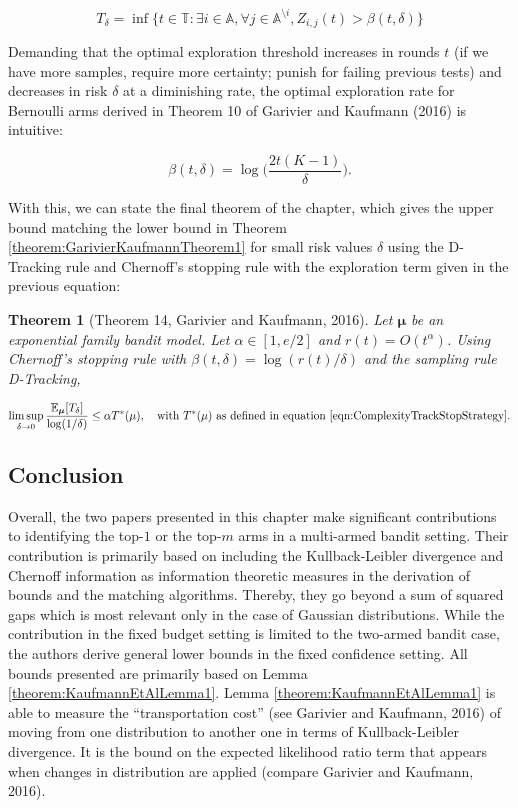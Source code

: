 \documentclass[11pt,]{article}
\newtheorem{theorem}{Theorem}
\begin{document}
\begin{equation*}
T_{\delta} = \inf \{t \in \mathbb{T}: \exists i \in \mathbb{A}, \forall j\in \mathbb{A}^{\setminus i}, Z_{i,j}(t) > \beta(t, \delta)\}
\end{equation*}

Demanding that the optimal exploration threshold increases in rounds
\(t\) (if we have more samples, require more certainty; punish for
failing previous tests) and decreases in risk \(\delta\) at a
diminishing rate, the optimal exploration rate for Bernoulli arms
derived in Theorem 10 of Garivier and Kaufmann (2016) is intuitive:

\begin{equation*}
\beta(t, \delta) = \log \Big(\frac{2t(K-1)}{\delta}\Big).
\end{equation*}

With this, we can state the final theorem of the chapter, which gives
the upper bound matching the lower bound in Theorem
\ref{theorem:GarivierKaufmannTheorem1} for small risk values \(\delta\)
using the D-Tracking rule and Chernoff's stopping rule with the
exploration term given in the previous equation:

\begin{theorem}[Theorem 14, Garivier and Kaufmann, 2016] \label{theorem:GarivierAndKaufmannTheorem14}
Let $\bm{\mu}$ be an exponential family bandit model. Let $\alpha \in [1, e/2]$ and $r(t) = O(t^{\alpha})$. Using Chernoff's stopping rule with $\beta(t,\delta) = \log(r(t)/\delta)$ and the sampling rule D-Tracking,

\begin{equation*}
\limsup_{\delta \to 0} \frac{\mathbb{E}_{\bm{\mu}}[T_{\delta}]}{\log(1/\delta)} \leq \alpha T^*(\mu), \quad \text{with } T^*(\mu) \text{ as defined in equation \ref{eqn:ComplexityTrackStopStrategy}}.
\end{equation*}
\end{theorem}

\subsection{Conclusion}\label{conclusion}

Overall, the two papers presented in this chapter make significant
contributions to identifying the top-\(1\) or the top-\(m\) arms in a
multi-armed bandit setting. Their contribution is primarily based on
including the Kullback-Leibler divergence and Chernoff information as
information theoretic measures in the derivation of bounds and the
matching algorithms. Thereby, they go beyond a sum of squared gaps which
is most relevant only in the case of Gaussian distributions. While the
contribution in the fixed budget setting is limited to the two-armed
bandit case, the authors derive general lower bounds in the fixed
confidence setting. All bounds presented are primarily based on Lemma
\ref{theorem:KaufmannEtAlLemma1}. Lemma \ref{theorem:KaufmannEtAlLemma1}
is able to measure the ``transportation cost'' (see Garivier and
Kaufmann, 2016) of moving from one distribution to another one in terms
of Kullback-Leibler divergence. It is the bound on the expected
likelihood ratio term that appears when changes in distribution are
applied (compare Garivier and Kaufmann, 2016).
\end{document}
